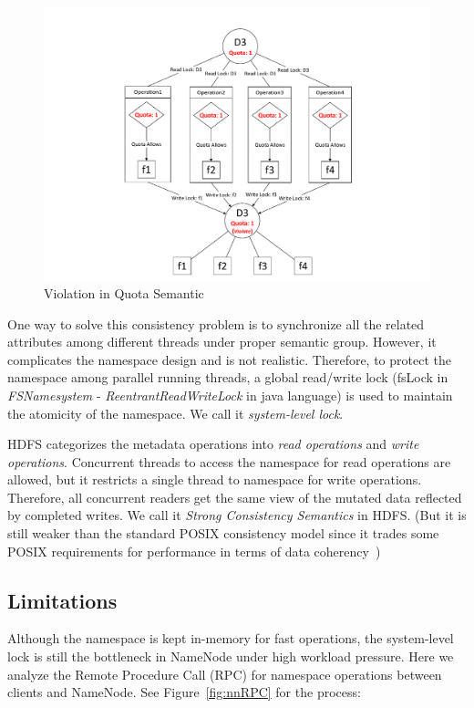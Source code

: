 \begin{figure}[h]
	\centering
	\includegraphics[scale=0.7]{figs/hdfsquota.pdf}
	\caption{Violation in Quota Semantic}
	\label{fig:hdfsquota}
\end{figure}

\noindent One way to solve this consistency problem is to synchronize all the related attributes among different threads under proper semantic group. However, it complicates the namespace design and is not realistic. Therefore, to protect the namespace among parallel running threads, a global read/write lock (fsLock in \textit{FSNamesystem} - \textit{ReentrantReadWriteLock} in java language) is used to maintain the atomicity of the namespace. We call it \textit{system-level lock}.

\noindent HDFS categorizes the metadata operations into \textit{read operations} and \textit{write operations}. Concurrent threads to access the namespace for read operations are allowed, but it restricts a single thread to namespace for write operations. Therefore, all concurrent readers get the same view of the mutated data reflected by completed writes. We call it \textit{Strong Consistency Semantics} in HDFS. (But it is still weaker than the standard POSIX consistency model since it trades some POSIX requirements for performance in terms of data coherency~\cite{white2012hadoop})

\subsection{Limitations}

\noindent Although the namespace is kept in-memory for fast operations, the system-level lock is still the bottleneck in NameNode under high workload pressure. Here we analyze the Remote Procedure Call (RPC) for namespace operations between clients and NameNode. See Figure~\ref{fig:nnRPC} for the process:

